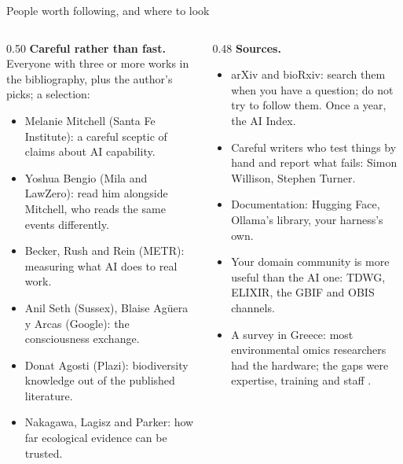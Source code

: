 \documentclass[11pt,aspectratio=169]{beamer}
\begin{document}
\begin{frame}{People worth following, and where to look}
  \footnotesize
  \begin{columns}[T]
    \begin{column}{0.50\textwidth}
      \textbf{Careful rather than fast.} Everyone with three or more works
      in the bibliography, plus the author's picks; a selection:
      \begin{itemize}
        \item Melanie Mitchell (Santa Fe Institute): a careful sceptic of
          claims about AI capability.
        \item Yoshua Bengio (Mila and LawZero): read him alongside Mitchell,
          who reads the same events differently.
        \item Becker, Rush and Rein (METR): measuring what AI does to real
          work.
        \item Anil Seth (Sussex), Blaise Ag\"uera y Arcas (Google): the
          consciousness exchange.
        \item Donat Agosti (Plazi): biodiversity knowledge out of the
          published literature.
        \item Nakagawa, Lagisz and Parker: how far ecological evidence can be
          trusted.
      \end{itemize}
    \end{column}
    \begin{column}{0.48\textwidth}
      \textbf{Sources.}
      \begin{itemize}
        \item arXiv and bioRxiv: search them when you have a question; do
          not try to follow them. Once a year, the AI Index.
        \item Careful writers who test things by hand and report what fails:
          Simon Willison, Stephen Turner.
        \item Documentation: Hugging Face, Ollama's library, your harness's
          own.
        \item Your domain community is more useful than the AI one: TDWG,
          ELIXIR, the GBIF and OBIS channels.
        \item A survey in Greece: most environmental omics researchers had
          the hardware; the gaps were expertise, training and staff
          \parencite{theodosopoulou2022greek}.
      \end{itemize}
    \end{column}
  \end{columns}
\end{frame}
\end{document}

